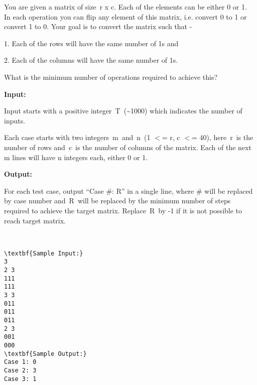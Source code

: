 

You are given a matrix of size r x c. Each of the elements can be either 0 or 1.  In each operation you can flip any element of this matrix, i.e. convert 0 to 1 or convert 1 to 0. Your goal is to convert the matrix such that -

1. Each of the rows will have the same number of 1s and

2. Each of the columns will have the same number of 1s.

What is the minimum number of operations required to achieve this?

\textbf{Input:}

Input starts with a positive integer T (\textasciitilde1000) which indicates the number of inputs.

Each case starts with two integers m and n (1 $<$= r, c $<$= 40), here r is the number of rows and c is the number of columns of the matrix. Each of the next m lines will have n integers each, either 0 or 1.

\textbf{Output:}

For each test case, output “Case \#: R” in a single line, where \# will be replaced by case number and R will be replaced by the minimum number of steps required to achieve the target matrix. Replace R by -1 if it is not possible to reach target matrix.

 
\begin{verbatim}
\textbf{Sample Input:}
3
2 3
111
111
3 3
011
011
011
2 3
001
000
\textbf{Sample Output:}
Case 1: 0
Case 2: 3
Case 3: 1
\end{verbatim}